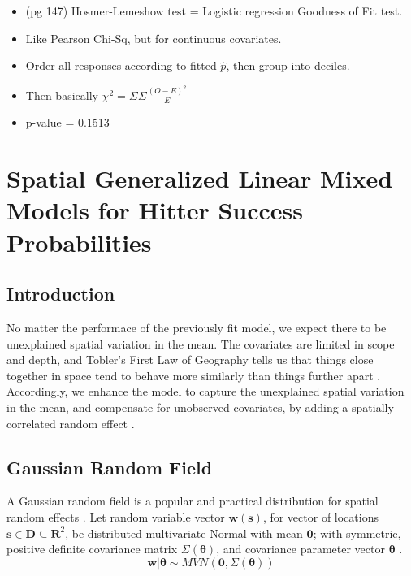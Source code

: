 \documentclass{article}
\begin{document}
  \begin{itemize} %
  \item (pg 147) Hosmer-Lemeshow test = Logistic regression Goodness of Fit test. 
  \item Like Pearson Chi-Sq, but for continuous covariates. 
  \item Order all responses according to fitted $\hat{p}$, then group into deciles. 
  \item Then basically $\chi^{2} = \Sigma \Sigma \frac{(O - E)^{2}}{E}$
  \item p-value = 0.1513
  \end{itemize}

\section{Spatial Generalized Linear Mixed Models for Hitter Success Probabilities}

\subsection{Introduction} %

No matter the performace of the previously fit model, we expect there to be unexplained spatial variation in the mean. The covariates are limited in scope and depth, and Tobler's First Law of Geography tells us that things close together in space tend to behave more similarly than things further apart \citep{Tobler1970}. Accordingly, we enhance the model to capture the unexplained spatial variation in the mean, and compensate for unobserved covariates, by adding a spatially correlated random effect  \citep{Banerjee2008}. 

\subsection{Gaussian Random Field} %

A Gaussian random field is a popular and practical distribution for spatial random effects \citep{Gelfand2010}. Let random variable vector $\pmb{w}(\pmb{s})$, for vector of locations $\pmb{s} \in \pmb{D} \subseteq \pmb{R}^{2}$, be distributed multivariate Normal with mean $\pmb{0}$; with symmetric, positive definite covariance matrix $\Sigma(\pmb{\theta})$, and covariance parameter vector $\pmb{\theta}$ \citep{Haran2011}.
\begin{equation}
\pmb{w} | \pmb{\theta} \sim MVN(\pmb{0}, \Sigma(\pmb{\theta})) 
\end{equation}
\end{document}
